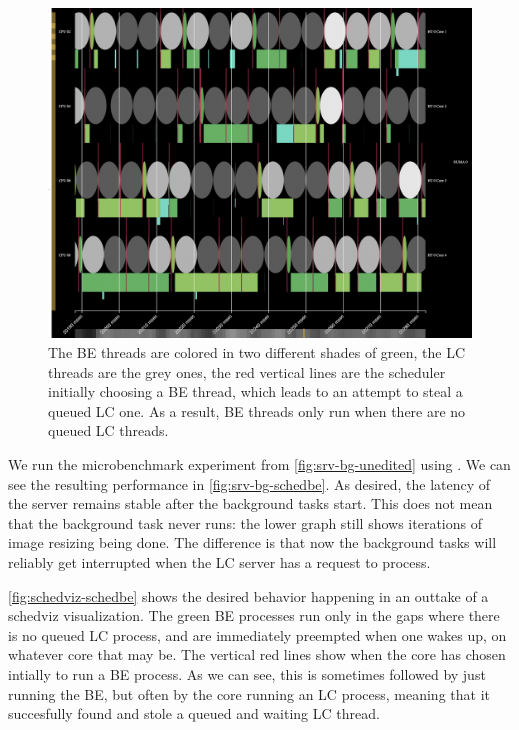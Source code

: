 \begin{figure}[t]
    \centering
    \includegraphics[width=\columnwidth]{graphs/schedviz-schedbe.png}
    \caption{The BE threads are colored in two different shades of green, the LC
    threads are the grey ones, the red vertical lines are the scheduler
    initially choosing a BE thread, which leads to an attempt to steal a queued
    LC one. As a result, BE threads only run when there are no queued LC
    threads.}\label{fig:schedviz-schedbe}
\end{figure}

We run the microbenchmark experiment from \autoref{fig:srv-bg-unedited} using
\schedbe{}. We can see the resulting performance in
\autoref{fig:srv-bg-schedbe}. As desired, the latency of the server remains
stable after the background tasks start. This does not mean that the background
task never runs: the lower graph still shows iterations of image resizing being
done. The difference is that now the background tasks will reliably get
interrupted when the LC server has a request to process. 

\autoref{fig:schedviz-schedbe} shows the desired behavior happening in an
outtake of a schedviz visualization. The green BE processes run only in the gaps
where there is no queued LC process, and are immediately preempted when one
wakes up, on whatever core that may be. The vertical red lines show when the
core has chosen intially to run a BE process. As we can see, this is sometimes
followed by just running the BE, but often by the core running an LC process,
meaning that it succesfully found and stole a queued and waiting LC thread.

